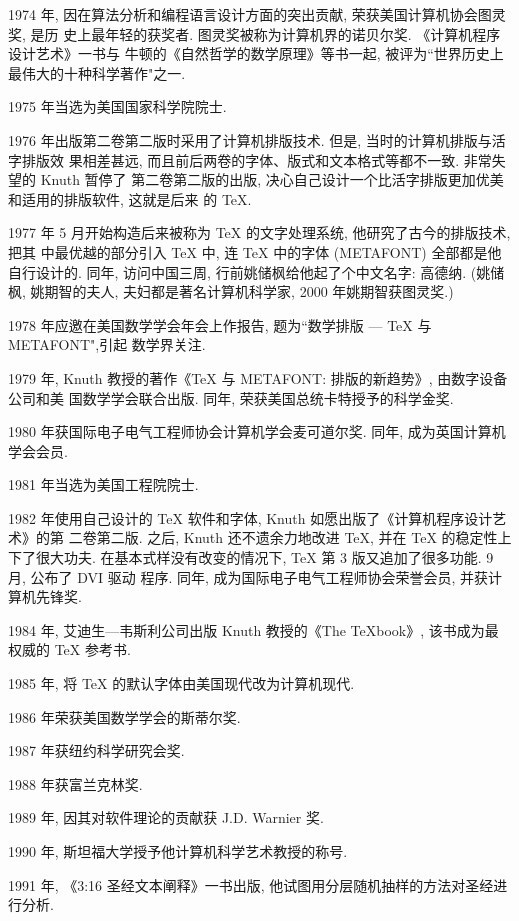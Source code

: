 1974 年, 因在算法分析和编程语言设计方面的突出贡献, 荣获美国计算机协会图灵奖, 是历
史上最年轻的获奖者. 图灵奖被称为计算机界的诺贝尔奖. 《计算机程序设计艺术》一书与
牛顿的《自然哲学的数学原理》等书一起, 被评为``世界历史上最伟大的十种科学著作"之一.

1975 年当选为美国国家科学院院士.

1976 年出版第二卷第二版时采用了计算机排版技术. 但是, 当时的计算机排版与活字排版效
果相差甚远, 而且前后两卷的字体、版式和文本格式等都不一致. 非常失望的 Knuth 暂停了
第二卷第二版的出版, 决心自己设计一个比活字排版更加优美和适用的排版软件, 这就是后来
的 \TeX.

1977 年 5 月开始构造后来被称为 \TeX{} 的文字处理系统, 他研究了古今的排版技术, 把其
中最优越的部分引入 \TeX{} 中, 连 \TeX{} 中的字体 (METAFONT) 全部都是他自行设计的.
同年, 访问中国三周, 行前姚储枫给他起了个中文名字: 高德纳. (姚储枫, 姚期智的夫人,
夫妇都是著名计算机科学家, 2000 年姚期智获图灵奖.)

1978 年应邀在美国数学学会年会上作报告, 题为``数学排版 --- \TeX{} 与 METAFONT",引起
数学界关注.

1979 年, Knuth 教授的著作《\TeX{} 与 METAFONT: 排版的新趋势》, 由数字设备公司和美
国数学学会联合出版. 同年, 荣获美国总统卡特授予的科学金奖.

1980 年获国际电子电气工程师协会计算机学会麦可道尔奖. 同年, 成为英国计算机学会会员.

1981 年当选为美国工程院院士.

1982 年使用自己设计的 \TeX{} 软件和字体, Knuth 如愿出版了《计算机程序设计艺术》的第
二卷第二版. 之后, Knuth 还不遗余力地改进 \TeX, 并在 \TeX{} 的稳定性上下了很大功夫.
在基本式样没有改变的情况下, \TeX{} 第 3 版又追加了很多功能. 9 月, 公布了 DVI 驱动
程序. 同年, 成为国际电子电气工程师协会荣誉会员, 并获计算机先锋奖.

1984 年, 艾迪生---韦斯利公司出版 Knuth 教授的《The TeXbook》, 该书成为最权威的 \TeX{}
参考书.

1985 年, 将 \TeX{} 的默认字体由美国现代改为计算机现代.

1986 年荣获美国数学学会的斯蒂尔奖.

1987 年获纽约科学研究会奖.

1988 年获富兰克林奖.

1989 年, 因其对软件理论的贡献获 J.D. Warnier 奖.

1990 年, 斯坦福大学授予他计算机科学艺术教授的称号.

1991 年, 《3:16 圣经文本阐释》一书出版, 他试图用分层随机抽样的方法对圣经进行分析.

